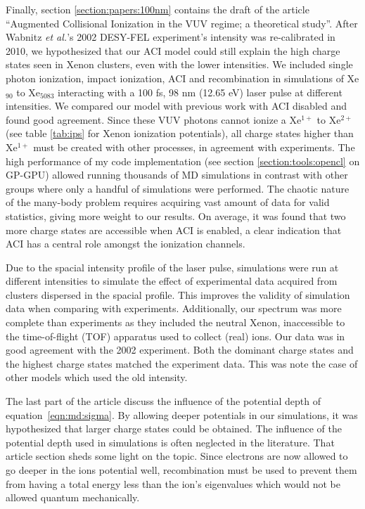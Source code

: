 


Finally, section \ref{section:papers:100nm} contains the draft of the article
``Augmented Collisional Ionization in the VUV regime; a theoretical study''.
After Wabnitz \textit{et al.}'s
2002 DESY-FEL experiment's intensity was re-calibrated in 2010, we hypothesized
that our ACI model could still explain the high charge states seen in Xenon
clusters, even with the lower intensities. We included single photon ionization,
impact ionization, ACI and recombination in simulations of Xe$_{90}$ to Xe$_{5083}$
interacting with a 100 fs, 98 nm (12.65 eV) laser pulse at different intensities.
We compared our model
with previous work with ACI disabled and found good agreement. Since these VUV
photons cannot ionize a Xe$^{1+}$ to Xe$^{2+}$ (see table \ref{tab:ips} for Xenon
ionization potentials), all charge states higher than Xe$^{1+}$ must be created
with other processes, in agreement with experiments. The high performance of my
code implementation (see section \ref{section:tools:opencl} on GP-GPU) allowed
running thousands of MD simulations in contrast with other groups where only
a handful of simulations were performed. The chaotic nature of the many-body
problem requires acquiring vast amount of data for valid statistics, giving more
weight to our results. On average, it was found that two more charge states are
accessible when ACI is enabled, a clear indication that ACI has a central role
amongst the ionization channels.

Due to the spacial intensity profile of the laser pulse, simulations were run
at different intensities to simulate the effect of experimental data acquired
from clusters dispersed in the spacial profile. This improves the validity of
simulation data when comparing with experiments. Additionally, our spectrum
was more complete than experiments as they included the neutral Xenon,
inaccessible to the time-of-flight (TOF) apparatus used to collect (real) ions.
Our data was in good agreement with the 2002 experiment. Both the dominant
charge states and the highest charge states matched the experiment data. This
was note the case of other models which used the old intensity.

The last part of the article discuss the influence of the potential depth
of equation~\eqref{eqn:md:sigma}.
By allowing deeper potentials in our
simulations, it was hypothesized that larger charge states could be obtained.
The influence of the potential depth used in simulations is often neglected in
the literature. That article section sheds some light on the topic.
Since electrons are now allowed to go deeper in the ions potential well,
recombination must be used to prevent them from having a total energy less than
the ion's eigenvalues which would not be allowed quantum mechanically.

